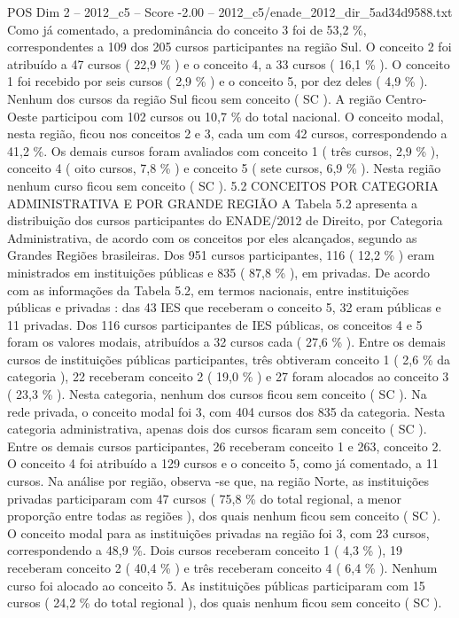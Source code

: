 \begin{textsample}{POS Dim 2 – 2012\_c5 – Score -2.00 – 2012\_c5/enade\_2012\_dir\_5ad34d9588.txt}
Como já comentado, a predominância do conceito 3 foi de 53,2 \%, correspondentes a 109 dos 205 cursos participantes na região Sul.
O conceito 2 foi atribuído a 47 cursos ( 22,9 \% ) e o conceito 4, a 33 cursos ( 16,1 \% ).
O conceito 1 foi recebido por seis cursos ( 2,9 \% ) e o conceito 5, por dez deles ( 4,9 \% ).
Nenhum dos cursos da região Sul ficou sem conceito ( SC ).
A região Centro-Oeste participou com 102 cursos ou 10,7 \% do total nacional.
O conceito modal, nesta região, ficou nos conceitos 2 e 3, cada um com 42 cursos, correspondendo a 41,2 \%.
Os demais cursos foram avaliados com conceito 1 ( três cursos, 2,9 \% ), conceito 4 ( oito cursos, 7,8 \% ) e conceito 5 ( sete cursos, 6,9 \% ).
Nesta região nenhum curso ficou sem conceito ( SC ). 5.2 CONCEITOS POR CATEGORIA ADMINISTRATIVA E POR GRANDE REGIÃO A Tabela 5.2 apresenta a distribuição dos cursos participantes do ENADE/2012 de Direito, por Categoria Administrativa, de acordo com os conceitos por eles alcançados, segundo as Grandes Regiões brasileiras.
Dos 951 cursos participantes, 116 ( 12,2 \% ) eram ministrados em instituições públicas e 835 ( 87,8 \% ), em privadas.
De acordo com as informações da Tabela 5.2, em termos nacionais, entre instituições públicas e privadas : das 43 IES que receberam o conceito 5, 32 eram públicas e 11 privadas.
Dos 116 cursos participantes de IES públicas, os conceitos 4 e 5 foram os valores modais, atribuídos a 32 cursos cada ( 27,6 \% ).
Entre os demais cursos de instituições públicas participantes, três obtiveram conceito 1 ( 2,6 \% da categoria ), 22 receberam conceito 2 ( 19,0 \% ) e 27 foram alocados ao conceito 3 ( 23,3 \% ).
Nesta categoria, nenhum dos cursos ficou sem conceito ( SC ).
Na rede privada, o conceito modal foi 3, com 404 cursos dos 835 da categoria.
Nesta categoria administrativa, apenas dois dos cursos ficaram sem conceito ( SC ).
Entre os demais cursos participantes, 26 receberam conceito 1 e 263, conceito 2.
O conceito 4 foi atribuído a 129 cursos e o conceito 5, como já comentado, a 11 cursos.
Na análise por região, observa -se que, na região Norte, as instituições privadas participaram com 47 cursos ( 75,8 \% do total regional, a menor proporção entre todas as regiões ), dos quais nenhum ficou sem conceito ( SC ).
O conceito modal para as instituições privadas na região foi 3, com 23 cursos, correspondendo a 48,9 \%.
Dois cursos receberam conceito 1 ( 4,3 \% ), 19 receberam conceito 2 ( 40,4 \% ) e três receberam conceito 4 ( 6,4 \% ).
Nenhum curso foi alocado ao conceito 5.
As instituições públicas participaram com 15 cursos ( 24,2 \% do total regional ), dos quais nenhum ficou sem conceito ( SC ).

\end{textsample}
